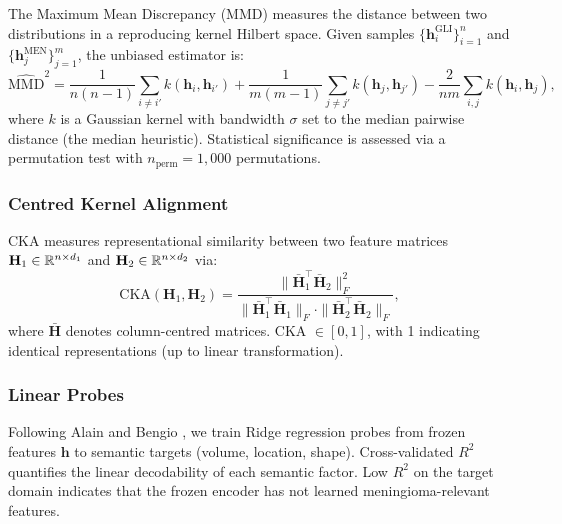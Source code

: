 The Maximum Mean Discrepancy (MMD) \cite{gretton2012kernel} measures the
distance between two distributions in a reproducing kernel Hilbert space.
Given samples $\{\mathbf{h}_i^{\text{GLI}}\}_{i=1}^{n}$ and
$\{\mathbf{h}_j^{\text{MEN}}\}_{j=1}^{m}$, the unbiased estimator is:
\begin{equation}
  \widehat{\text{MMD}}^2 = \frac{1}{n(n-1)}\sum_{i \neq i'} k(\mathbf{h}_i,
    \mathbf{h}_{i'}) + \frac{1}{m(m-1)}\sum_{j \neq j'} k(\mathbf{h}_j,
    \mathbf{h}_{j'}) - \frac{2}{nm}\sum_{i,j} k(\mathbf{h}_i, \mathbf{h}_j),
  \label{eq:mmd}
\end{equation}
where $k$ is a Gaussian kernel with bandwidth $\sigma$ set to the median
pairwise distance (the median heuristic). Statistical significance is
assessed via a permutation test with $n_{\text{perm}} = 1{,}000$
permutations.

\subsubsection{Centred Kernel Alignment}

CKA \cite{kornblith2019similarity} measures representational similarity
between two feature matrices $\mathbf{H}_1 \in \mathbb{R}^{n \times d_1}$ and
$\mathbf{H}_2 \in \mathbb{R}^{n \times d_2}$ via:
\begin{equation}
  \text{CKA}(\mathbf{H}_1, \mathbf{H}_2) = \frac{
    \|\bar{\mathbf{H}}_1^\top \bar{\mathbf{H}}_2\|_F^2
  }{
    \|\bar{\mathbf{H}}_1^\top \bar{\mathbf{H}}_1\|_F \cdot
    \|\bar{\mathbf{H}}_2^\top \bar{\mathbf{H}}_2\|_F
  },
  \label{eq:cka}
\end{equation}
where $\bar{\mathbf{H}}$ denotes column-centred matrices. CKA $\in [0, 1]$,
with 1 indicating identical representations (up to linear transformation).

\subsubsection{Linear Probes}

Following Alain and Bengio \cite{alain2017understanding}, we train Ridge
regression probes from frozen features $\mathbf{h}$ to semantic targets
(volume, location, shape). Cross-validated $R^2$ quantifies the linear
decodability of each semantic factor. Low $R^2$ on the target domain indicates
that the frozen encoder has not learned meningioma-relevant features.

